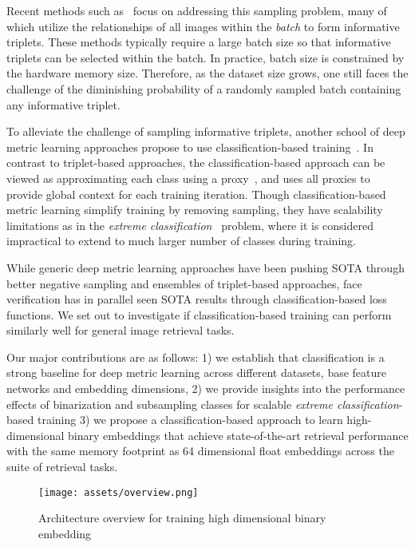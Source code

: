 \documentclass{bmvc2k}
\begin{document}
Recent methods such as~\cite{songCVPR16,npairNIPS2016,defensetriplet,samplingmatters} focus on addressing this sampling problem, many of which utilize the relationships of all images within the \textit{batch} to form informative triplets. These methods typically require a large batch size so that informative triplets can be selected within the batch. In practice, batch size is constrained by the hardware memory size. Therefore, as the dataset size grows, one still faces the challenge of the diminishing probability of a randomly sampled batch containing any informative triplet.

To alleviate the challenge of sampling informative triplets, another school of deep metric learning approaches propose to use classification-based training~\cite{nofusslearning,Wang2018CosFaceLM,Wang2018AdditiveMS,Liu2017SphereFaceDH,Xuan2018DeepRE}. In contrast to triplet-based approaches, the classification-based approach can be viewed as approximating each class using a proxy~\cite{nofusslearning}, and uses all proxies to provide global context for each training iteration. Though classification-based metric learning simplify training by removing sampling, they have scalability limitations as in the \textit{extreme classification}~\cite{songCVPR16} problem, where it is considered impractical to extend to much larger number of classes during training.

While generic deep metric learning approaches have been pushing SOTA through better negative sampling and ensembles of triplet-based approaches, face verification has in parallel seen SOTA results through classification-based loss functions. We set out to investigate if classification-based training can perform similarly well for general image retrieval tasks. 

Our major contributions are as follows: 1) we establish that classification is a strong baseline for deep metric learning across different datasets, base feature networks and embedding dimensions, 2) we provide insights into the performance effects of binarization and subsampling classes for scalable \textit{extreme classification}-based training 3) we propose a classification-based approach to learn high-dimensional binary embeddings that achieve state-of-the-art retrieval performance with the same memory footprint as 64 dimensional float embeddings across the suite of retrieval tasks. \begin{figure*}
\centering
  \texttt{[image: assets/overview.png]}
  \caption{Architecture overview for training high dimensional binary embedding}
  \label{fig:overview}
\end{figure*}
\end{document}
